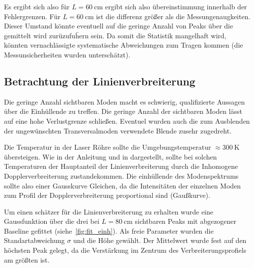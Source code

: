 \documentclass[slug=GL, room=HZDR\ Dresden/Rossendorf\,\ Geb.\ 620/123, supervisor=Tim\ Ziegler]{../../Lab_Report_LaTeX/lab_report}
\begin{document}
Es ergibt sich also f\"ur \(L=\SI{60}{\centi\meter}\) ergibt sich also
\"ubereinstimmung innerhalb der Fehlergrenzen. F\"ur
\(L=\SI{60}{\centi\meter}\) ist die differenz gr\"o\ss{}er als die
Messungenaugkeiten. Dieser Umstand k\"onnte eventuell auf die geringe
Anzahl von Peaks \"uber die gemittelt wird zur\"uzufu\"hern sein. Da
somit die Statistik mangelhaft wird, k\"onnten vernachl\"assigte
systematische Abweichungen zum Tragen kommen (die Messunsicherheiten
wurden untersch\"atzt).

\subsection{Betrachtung der Linienverbreiterung}
\label{sec:linver}

Die geringe Anzahl sichtbaren Moden macht es schwierig, qualifizierte
Aussagen \"uber die Einh\"ullende zu treffen. Die geringe Anzahl der
sichtbaren Moden l\"asst auf eine hohe Verlustgrenze
schlie\ss{}en. Eventuel wurden auch die zum Ausblenden der
ungew\"unschten Transversalmoden verwendete Blende zusehr zugedreht.

Die Temperatur in der Laser R\"ohre sollte die Umgebungstemperatur
\(\approx \SI{300}{\kelvin}\) \"ubersteigen. Wie in der Anleitung und
in  dargestellt, sollte bei solchen Temperaturen
der Hauptanteil der Linienverbreiterung durch die Inhomogene
Dopplerverbreiterung zustandekommen. Die einh\"ullende des
Modenspektrums sollte also einer Gausskurve Gleichen, da die
Intensit\"aten der einzelnen Moden zum Profil der Dopplerverbreiterung
proportional sind (Gau\ss{}kurve).

Um einen sch\"atzer f\"ur die Linienverbreiterung zu erhalten wurde
eine Gaussfunktion \"uber die drei bei \(L=\SI{80}{\centi\meter}\)
sichtbaren Peaks mit abgezogener Baseline gefittet
(siehe~\ref{fig:fit_einh}). Als freie Parameter wurden die
Standartabweichung \(\sigma\) und die H\"ohe gew\"ahlt. Der
Mittelwert wurde fest auf den h\"ochsten Peak gelegt, da die
Verst\"arkung im Zentrum des Verbreiterungsprofiels am gr\"o\ss{}ten
ist.
\end{document}
